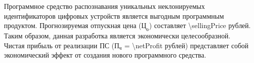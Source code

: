 Программное средство распознавания уникальных неклонируемых идентификаторов цифровых устройств является выгодным программным продуктом.
Прогнозируемая отпускная цена ($\text{Ц}_\text{о}$) составляет \num{\sellingPrice} рублей. Таким образом, данная разработка является экономически целесообразной.
Чистая прибыль от реализации ПС ($ \text{П}_\text{ч} $ = \num{\netProfit} рублей) представляет собой экономический эффект от создания нового программного средства.


\hfill
\clearpage
